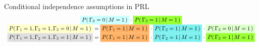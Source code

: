 \begin{frame}{\vskip -0.3cm \Large Conditional independence assumptions in PRL}
{\begin{equation*}
\begin{array}{c}
	\colorbox{lightCyan}{$P\!\left(\,\Gamma_{2}=0\,\vert\,M=1\,\right)$} \cdot
	\colorbox{mediumGreen}{$P\!\left(\,\Gamma_{3}=1\,\vert\,M=1\,\right)$}
\\
\colorbox{lightYellow}{$P\!\left(\,\Gamma_{1}=1,\Gamma_{2}=1,\Gamma_{3}=0\,\vert\,M=1\,\right)$}=
	\colorbox{mediumOrange}{$P\!\left(\,\Gamma_{1}=1\,\vert\,M=1\,\right)$} \cdot
	\colorbox{mediumCyan}{$P\!\left(\,\Gamma_{2}=1\,\vert\,M=1\,\right)$} \cdot
	\colorbox{lightGreen}{$P\!\left(\,\Gamma_{3}=0\,\vert\,M=1\,\right)$}
\\
\colorbox{lightGray}{$P\!\left(\,\Gamma_{1}=1,\Gamma_{2}=1,\Gamma_{3}=1\,\vert\,M=1\,\right)$}=
	\colorbox{mediumOrange}{$P\!\left(\,\Gamma_{1}=1\,\vert\,M=1\,\right)$} \cdot
	\colorbox{mediumCyan}{$P\!\left(\,\Gamma_{2}=1\,\vert\,M=1\,\right)$} \cdot
	\colorbox{mediumGreen}{$P\!\left(\,\Gamma_{3}=1\,\vert\,M=1\,\right)$}
\\

\end{array}
\end{equation*}}
\end{frame}
